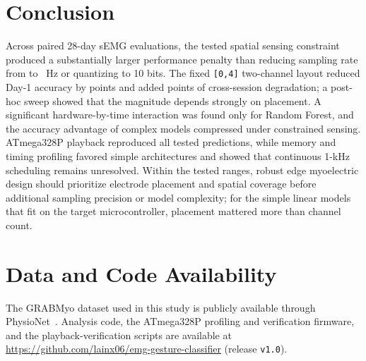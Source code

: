 \documentclass[preprint,12pt]{elsarticle}
\begin{document}
\section{Conclusion}
Across paired 28-day sEMG evaluations, the tested spatial sensing constraint produced a substantially larger performance penalty than reducing sampling rate from \fsClinical{} to \fsCommodity{}~Hz or quantizing to 10 bits. The fixed \texttt{[0,4]} two-channel layout reduced Day-1 accuracy by \spatialDayOnePenalty{} points and added \spatialDropPenalty{} points of cross-session degradation; a post-hoc sweep showed that the magnitude depends strongly on placement. A significant hardware-by-time interaction was found only for Random Forest, and the accuracy advantage of complex models compressed under constrained sensing. ATmega328P playback reproduced all \nVerifyWindows{} tested predictions, while memory and timing profiling favored simple architectures and showed that continuous 1-kHz scheduling remains unresolved. Within the tested ranges, robust edge myoelectric design should prioritize electrode placement and spatial coverage before additional sampling precision or model complexity; for the simple linear models that fit on the target microcontroller, placement mattered more than channel count.

\FloatBarrier
\section*{Data and Code Availability}
The GRABMyo dataset used in this study is publicly available through PhysioNet~\cite{PhysioNet-grabmyo-1.1.0, pradhan2022grabmyo}. Analysis code, the ATmega328P profiling and verification firmware, and the playback-verification scripts are available at \url{https://github.com/lainx06/emg-gesture-classifier} (release \texttt{v1.0}).

 
\end{document}
